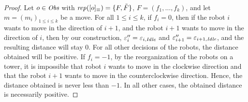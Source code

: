  \begin{proof}
 Let $o \in \textit{Obs}$ with $\mathit{rep}([o]_{\equiv})=\{F, \tilde{F}\}$,  $F=(f_1, \dots, f_k)$, and let $m=(m_i)_{1\leq i \leq k}$ be a move. 
  For all $1\leq i\leq k$, if $f_i=0$, then if the robot $i$ wants to move in the direction of $i+1$, 
  and the robot  $i+1$ wants to move in the direction of $i$, 
  then by our construction, $\varepsilon''_i=\varepsilon_{i, \textit{Idle}}$ and $\varepsilon''_{i+1}=\varepsilon_{i+1, \textit{Idle}}$, 
  and the resulting distance will stay 0. 
  For all other decisions of the robots, the distance obtained will be positive. 
  If $f_i=-1$, by the reorganization of the robots on a tower, it is impossible
 that robot $i$ wants to move in the clockwise direction and that the robot $i+1$
  wants to move in the counterclockwise direction. Hence, the distance obtained
 is never less than $-1$. In all other cases, the obtained distance is necessarily positive.
 \end{proof} 
 

